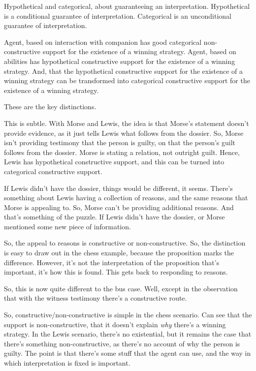 \documentclass[10pt]{article}
\begin{document}
Hypothetical and categorical, about guaranteeing an interpretation.
Hypothetical is a conditional guarantee of interpretation.
Categorical is an unconditional guarantee of interpretation.

Agent, based on interaction with companion has good categorical non-constructive support for the existence of a winning strategy.
Agent, based on abilities has hypothetical constructive support for the existence of a winning strategy.
And, that the hypothetical constructive support for the existence of a winning strategy can be transformed into categorical constructive support for the existence of a winning strategy.

These are the key distinctions.

\begin{note}
  This is subtle.
  With Morse and Lewis, the idea is that Morse's statement doesn't provide evidence, as it just tells Lewis what follows from the dossier.
  So, Morse isn't providing testimony that the person is guilty, on that the person's guilt follows from the dossier.
  Morse is stating a relation, not outright guilt.
  Hence, Lewis has hypothetical constructive support, and this can be turned into categorical constructive support.

  If Lewis didn't have the dossier, things would be different, it seems.
  There's something about Lewis having a collection of reasons, and the same reasons that Morse is appealing to.
  So, Morse can't be providing additional reasons.
  And that's something of the puzzle.
  If Lewis didn't have the dossier, or Morse mentioned some new piece of information.

  So, the appeal to reasons is constructive or non-constructive.
  So, the distinction is easy to draw out in the chess example, because the proposition marks the difference.
  However, it's not the interpretation of the proposition that's important, it's how this is found.
  This gets back to responding to reasons.

  So, this is now quite different to the bus case.
  Well, except in the observation that with the witness testimony there's a constructive route.

  So, constructive/non-constructive is simple in the chess scenario.
  Can see that the support is non-constructive, that it doesn't explain \emph{why} there's a winning strategy.
  In the Lewis scenario, there's no existential, but it remains the case that there's something non-constructive, as there's no account of why the person is guilty.
  The point is that there's some stuff that the agent can use, and the way in which interpretation is fixed is important.


\end{note}
\end{document}

